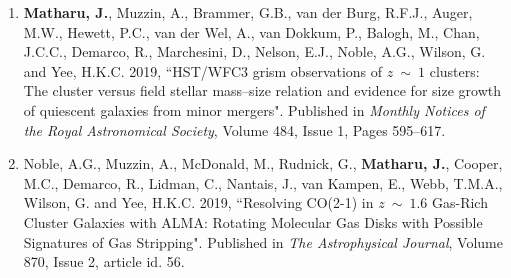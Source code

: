 \documentclass[11pt]{article}
\makeatletter
\newlength{\bibhang}
\newlength{\bibsep}
 {\@listi \global\bibsep\itemsep \global\advance\bibsep by\parsep}
\newenvironment{bibsection}%
        {\begin{enumerate}{}{%
       \setlength{\leftmargin}{\bibhang}%
       \setlength{\itemindent}{-\leftmargin}%
       \setlength{\itemsep}{\bibsep}%
       \setlength{\parsep}{\z@}%
        \setlength{\partopsep}{0pt}%
        \setlength{\topsep}{0pt}}}
        {\end{enumerate}\vspace{-.6\baselineskip}}
\renewcommand{\section}[1]{\pagebreak[3]%
    \hyphenpenalty=10000%
    \vspace{1.3\baselineskip}%
    \phantomsection\addcontentsline{toc}{section}{#1}%
    \noindent\llap{\scshape\smash{\parbox[t]{\marginparwidth}{\raggedright #1}}}%
    \vspace{-\baselineskip}\par}
\makeatother
\begin{document}
\begin{bibsection}
	    
	\item  {\bf Matharu, J.}, Muzzin, A., Brammer, G.B., van der Burg, R.F.J., Auger, M.W., Hewett, P.C., van der Wel, A., van Dokkum, P., Balogh, M., Chan, J.C.C., Demarco, R., Marchesini, D., Nelson, E.J., Noble, A.G., Wilson, G. and Yee, H.K.C.  2019, ``HST/WFC3 grism observations of $z~\mathtt{\sim}~1$ clusters: The cluster versus field stellar mass--size relation and evidence for size growth of quiescent galaxies from minor mergers". Published in \emph{Monthly Notices of the Royal Astronomical Society}, Volume 484, Issue 1, Pages 595--617.

    \item Noble, A.G., Muzzin, A., McDonald, M., Rudnick, G., {\bf Matharu, J.}, Cooper, M.C., Demarco, R., Lidman, C., Nantais, J., van Kampen, E., Webb, T.M.A., Wilson, G. and Yee, H.K.C.  2019, ``Resolving CO(2-1) in $z~\mathtt{\sim}~1.6$ Gas-Rich Cluster Galaxies with ALMA: Rotating Molecular Gas Disks with Possible Signatures of Gas Stripping". Published in \emph{The Astrophysical Journal}, Volume 870, Issue 2, article id. 56.
  
\end{bibsection}


\end{document}
